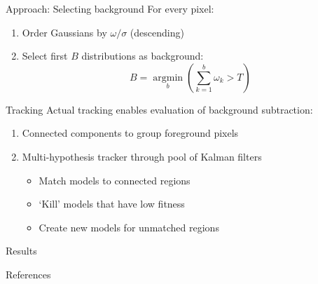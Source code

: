 \documentclass{beamer}
\DeclareMathOperator*{\argmin}{argmin}
\begin{document}
\begin{frame}{Approach: Selecting background}
For every pixel:
\begin{enumerate} 
\item Order Gaussians by $\omega / \sigma$ (descending)
\item Select first $B$ distributions as background:
$$ B = \argmin\limits_b \left( \sum_{k=1}^b \omega_k > T \right)$$
\end{enumerate}
\end{frame}

\begin{frame}{Tracking}
Actual tracking enables evaluation of background subtraction:
\begin{enumerate}
\item Connected components to group foreground pixels
\item Multi-hypothesis tracker through pool of Kalman filters
\begin{itemize}
\item Match models to connected regions
\item `Kill' models that have low fitness
\item Create new models for unmatched regions
\end{itemize}
\end{enumerate}
\end{frame}

\begin{frame}{Results}

\end{frame}

\begin{frame}[allowframebreaks]{References}
	
	
\end{frame}
\end{document}
